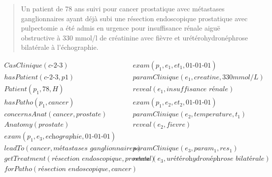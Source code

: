 \begin{quote}
    Un patient de 78 ans suivi pour cancer prostatique avec métastases ganglionnaires ayant déjà subi une résection endoscopique prostatique avec pulpectomie a été admis en urgence pour insuffisance rénale aiguë obstructive à 330 mmol/l de créatinine avec fièvre et urétérohydronéphrose bilatérale à l'échographie.
\end{quote}

\begin{align*}
    CasClinique(\textit{c-2-3})  &~ exam(p_1, e_1, et_1, \textit{01-01-01}) \\
    hasPatient(\textit{c-2-3}, p1) &~ paramClinique(e_1, creatine, \textit{330mmol/L}) \\
    Patient(p_1, 78, H)  &~ reveal(e_1, \textit{insuffisance rénale}) \\
    hasPatho(p_1, cancer)  &~ exam(p_1, e_2, et_2, \textit{01-01-01}) \\
    concernsAnat(cancer, prostate) &~ paramClinique(e_2, temperature, t_1) \\
    Anatomy(prostate)  &~ reveal(e_2, fievre) \\
    exam(p_1, e_3, \textit{echographie}, \textit{01-01-01}) \\
    leadTo(cancer, \textit{métastases ganglionnaires})  &~ paramClinique(e_3, param_1, res_1) \\
    getTreatment(\textit{résection endoscopique}, prostate) &~ reveal(e_3, \textit{urétérohydronéphrose bilatérale}) \\
    forPatho(\textit{résection endoscopique}, cancer)
\end{align*}

